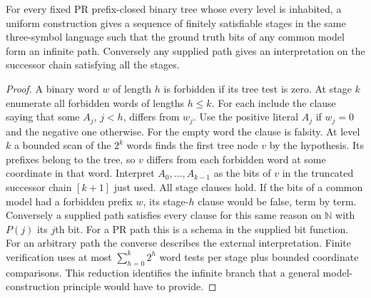 \begin{proposition}\label{prop:compbranch}
For every fixed PR prefix-closed binary tree whose every level is inhabited, a uniform construction gives a sequence of finitely satisfiable stages in the same three-symbol language such that the ground truth bits of any common model form an infinite path. Conversely any supplied path gives an interpretation on the successor chain satisfying all the stages.
\end{proposition}
\begin{proof}
A binary word $w$ of length $h$ is forbidden if its tree test is zero. At stage $k$ enumerate all forbidden words of lengths $h\le k$. For each include the clause saying that some $A_j$, $j<h$, differs from $w_j$. Use the positive literal $A_j$ if $w_j=0$ and the negative one otherwise. For the empty word the clause is falsity. At level $k$ a bounded scan of the $2^k$ words finds the first tree node $v$ by the hypothesis. Its prefixes belong to the tree, so $v$ differs from each forbidden word at some coordinate in that word. Interpret $A_0,\ldots,A_{k-1}$ as the bits of $v$ in the truncated successor chain $[k+1]$ just used. All stage clauses hold. If the bits of a common model had a forbidden prefix $w$, its stage-$h$ clause would be false, term by term. Conversely a supplied path satisfies every clause for this same reason on $\mathbb N$ with $P(j)$ its $j$th bit. For a PR path this is a schema in the supplied bit function. For an arbitrary path the converse describes the external interpretation. Finite verification uses at most $\sum_{h=0}^{k}2^h$ word tests per stage plus bounded coordinate comparisons. This reduction identifies the infinite branch that a general model-construction principle would have to provide.
\end{proof}

